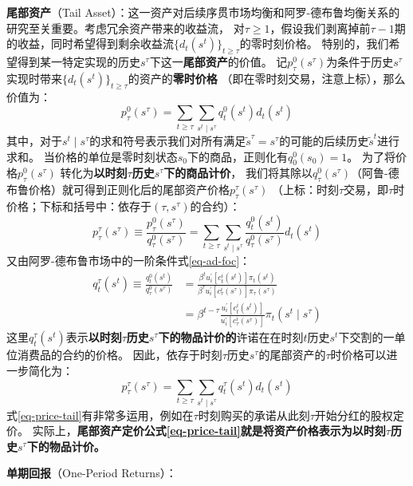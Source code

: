 \begin{example}
    \textbf{尾部资产}（Tail Asset）：这一资产对后续序贯市场均衡和阿罗-德布鲁均衡关系的研究至关重要。考虑冗余资产带来的收益流，
    对$\tau \geq 1$，假设我们剥离掉前$\tau-1$期的收益，同时希望得到剩余收益流$\{d_t\left(s^t\right)\}_{t\geq \tau}$的零时刻价格。
    特别的，我们希望得到某一特定实现的历史$s^\tau$下这一\textbf{尾部资产}的价值。
    记$p_{\tau}^0\left(s^\tau\right)$为条件于历史$s^{\tau}$实现时带来$\{d_t\left(s^t\right)\}_{t\geq \tau}$的资产的\textbf{零时价格}
    （即在零时刻交易，注意上标），那么价值为：
    \begin{equation}
        p_\tau^0\left(s^\tau\right)=\sum_{t \geq \tau} \sum_{s^t \mid s^\tau} q_t^0\left(s^t\right) d_t\left(s^t\right)
    \end{equation}
    其中，对于$s^t\mid s^{\tau}$的求和符号表示我们对所有满足$\tilde{s}^{\tau}=s^{\tau}$的可能的后续历史$\tilde{s}^t$进行求和。
    当价格的单位是零时刻状态$s_0$下的商品，正则化有$q_0^0\left(s_0\right)=1$。
    为了将价格$p_\tau^0\left(s^\tau\right)$ 转化为\textbf{以时刻$\tau$历史$s^{\tau}$下的商品计价}，
    我们将其除以$q_{\tau}^0\left(s^{\tau}\right)$（阿鲁-德布鲁价格）就可得到正则化后的尾部资产价格$p_\tau^\tau\left(s^\tau\right)$
    （上标：时刻$\tau$交易，即$\tau$时价格；下标和括号中：依存于$(\tau,s^{\tau})$的合约）：
    \begin{equation}
        p_\tau^\tau\left(s^\tau\right) \equiv \frac{p_\tau^0\left(s^\tau\right)}{q_\tau^0\left(s^\tau\right)}
            =\sum_{t \geq \tau} \sum_{s^t \mid s^\tau} \frac{q_t^0\left(s^t\right)}{q_\tau^0\left(s^\tau\right)} d_t\left(s^t\right)
    \end{equation}
    又由阿罗-德布鲁市场中的一阶条件式\ref{eq-ad-foc}：
    \begin{equation}
        \begin{aligned}
            q_t^\tau\left(s^t\right) 
                \equiv \frac{q_t^0\left(s^t\right)}{q_\tau^0\left(s^\tau\right)} 
                & =\frac{\beta^t u_i^{\prime}\left[c_t^i\left(s^t\right)\right] \pi_t\left(s^t\right)}
                    {\beta^\tau u_i^{\prime}\left[c_\tau^i\left(s^\tau\right)\right] \pi_\tau\left(s^\tau\right)} \\
                & =\beta^{t-\tau} \frac{u_i^{\prime}\left[c_t^i\left(s^t\right)\right]}
                    {u_i^{\prime}\left[c_\tau^i\left(s^\tau\right)\right]} \pi_t\left(s^t \mid s^\tau\right)
            \end{aligned}
    \end{equation}
    这里$q_t^\tau\left(s^t\right)$表示\textbf{以时刻$\tau$历史$s^{\tau}$下的物品计价的}许诺在在时刻$t$历史$s^t$下交割的一单位消费品的合约的价格。
    因此，依存于时刻$\tau$历史$s^{\tau}$的尾部资产的$\tau$时价格可以进一步简化为：
    \begin{equation}    \label{eq-price-tail}
        p_\tau^\tau\left(s^\tau\right)=\sum_{t \geq \tau} \sum_{s^t \mid s^\tau} q_t^\tau\left(s^t\right) d_t\left(s^t\right)
    \end{equation}
    式\ref{eq-price-tail}有非常多运用，例如在$\tau$时刻购买的承诺从此刻$\tau$开始分红的股权定价。
    实际上，\textbf{尾部资产定价公式\ref{eq-price-tail}就是将资产价格表示为以时刻$\tau$历史$s^{\tau}$下的物品计价。}
\end{example}

\begin{example}
    \textbf{单期回报}（One-Period Returns）：
\end{example}